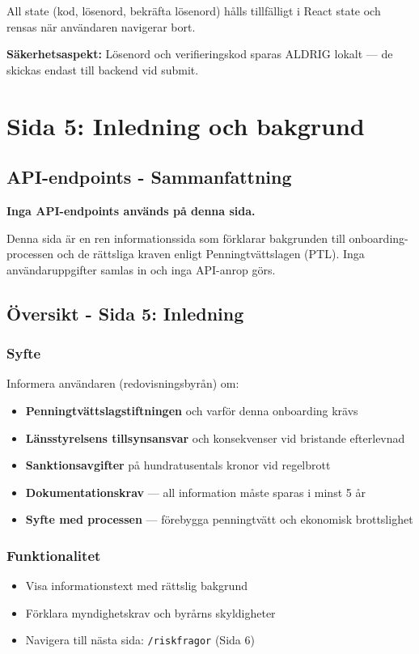 \documentclass[12pt,a4paper]{article}
\begin{document}
All state (kod, lösenord, bekräfta lösenord) hålls tillfälligt i React state och rensas när användaren navigerar bort.

\textbf{Säkerhetsaspekt:} Lösenord och verifieringskod sparas ALDRIG lokalt — de skickas endast till backend vid submit.

\newpage
\section{Sida 5: Inledning och bakgrund}

\subsection{API-endpoints - Sammanfattning}

\textbf{Inga API-endpoints används på denna sida.}

Denna sida är en ren informationssida som förklarar bakgrunden till onboarding-processen och de rättsliga kraven enligt Penningtvättslagen (PTL). Inga användaruppgifter samlas in och inga API-anrop görs.

\subsection{Översikt - Sida 5: Inledning}

\subsubsection{Syfte}
Informera användaren (redovisningsbyrån) om:
\begin{itemize}[noitemsep]
  \item \textbf{Penningtvättslagstiftningen} och varför denna onboarding krävs
  \item \textbf{Länsstyrelsens tillsynsansvar} och konsekvenser vid bristande efterlevnad
  \item \textbf{Sanktionsavgifter} på hundratusentals kronor vid regelbrott
  \item \textbf{Dokumentationskrav} — all information måste sparas i minst 5 år
  \item \textbf{Syfte med processen} — förebygga penningtvätt och ekonomisk brottslighet
\end{itemize}

\subsubsection{Funktionalitet}
\begin{itemize}[noitemsep]
  \item Visa informationstext med rättslig bakgrund
  \item Förklara myndighetskrav och byrårns skyldigheter
  \item Navigera till nästa sida: \texttt{/riskfragor} (Sida 6)
\end{itemize}
\end{document}
